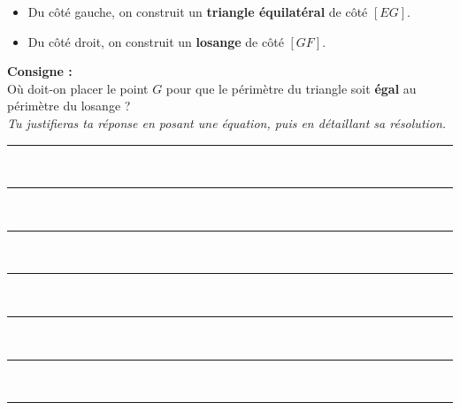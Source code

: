 \documentclass[11pt,a4paper]{article}
\begin{document}
\begin{itemize}
    \item Du côté gauche, on construit un \textbf{triangle équilatéral} de côté $[EG]$.
    \item Du côté droit, on construit un \textbf{losange} de côté $[GF]$.
\end{itemize}

\vspace{0.5cm}
\noindent \textbf{Consigne :} \\
Où doit-on placer le point $G$ pour que le périmètre du triangle soit \textbf{égal} au périmètre du losange ? \\
\textit{Tu justifieras ta réponse en posant une équation, puis en détaillant sa résolution.} \\[0.5cm]
\rule{\linewidth}{0.1pt} \\[-2mm]
\rule{\linewidth}{0.1pt} \\[-2mm]
\rule{\linewidth}{0.1pt} \\[-2mm]
\rule{\linewidth}{0.1pt} \\[-2mm]
\rule{\linewidth}{0.1pt} \\[-2mm]
\rule{\linewidth}{0.1pt} \\[-2mm]
\rule{\linewidth}{0.1pt}
\end{document}
